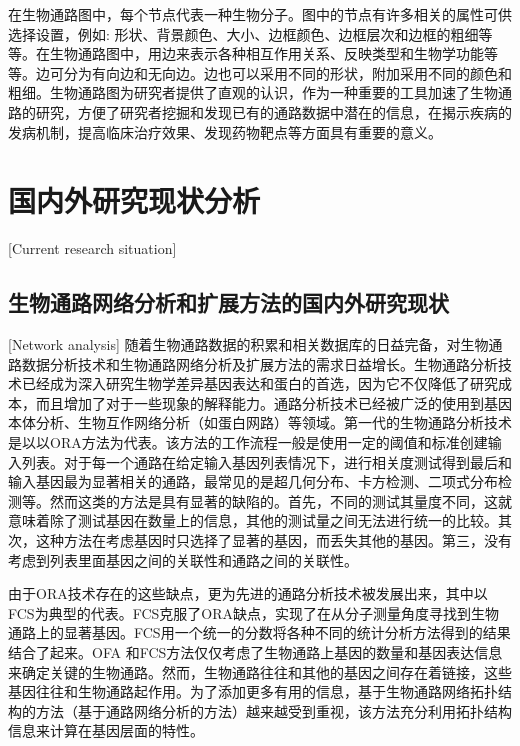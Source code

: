 在生物通路图中，每个节点代表一种生物分子。图中的节点有许多相关的属性可供选择设置，例如: 形状、背景颜色、大小、边框颜色、边框层次和边框的粗细等等。在生物通路图中，用边来表示各种相互作用关系、反映类型和生物学功能等等。边可分为有向边和无向边。边也可以采用不同的形状，附加采用不同的颜色和粗细。生物通路图为研究者提供了直观的认识，作为一种重要的工具加速了生物通路的研究，方便了研究者挖掘和发现已有的通路数据中潜在的信息，在揭示疾病的发病机制，提高临床治疗效果、发现药物靶点等方面具有重要的意义。

\section{国内外研究现状分析}[Current research situation]
\subsection{生物通路网络分析和扩展方法的国内外研究现状}[Network analysis]
 随着生物通路数据的积累和相关数据库的日益完备，对生物通路数据分析技术和生物通路网络分析及扩展方法的需求日益增长。生物通路分析技术已经成为深入研究生物学差异基因表达和蛋白的首选，因为它不仅降低了研究成本，而且增加了对于一些现象的解释能力。通路分析技术已经被广泛的使用到基因本体分析、生物互作网络分析（如蛋白网路）等领域。第一代的生物通路分析技术是以以ORA\cite{goeman2007analyzing}方法为代表。该方法的工作流程一般是使用一定的阈值和标准创建输入列表。对于每一个通路在给定输入基因列表情况下，进行相关度测试得到最后和输入基因最为显著相关的通路，最常见的是超几何分布、卡方检测、二项式分布检测等。然而这类的方法是具有显著的缺陷的。首先，不同的测试其量度不同，这就意味着除了测试基因在数量上的信息，其他的测试量之间无法进行统一的比较。其次，这种方法在考虑基因时只选择了显著的基因，而丢失其他的基因。第三，没有考虑到列表里面基因之间的关联性和通路之间的关联性。

 由于ORA技术存在的这些缺点，更为先进的通路分析技术被发展出来，其中以FCS\cite{lee2011prioritizing}为典型的代表。FCS克服了ORA缺点，实现了在从分子测量角度寻找到生物通路上的显著基因。FCS用一个统一的分数将各种不同的统计分析方法得到的结果结合了起来。OFA 和FCS方法仅仅考虑了生物通路上基因的数量和基因表达信息来确定关键的生物通路。然而，生物通路往往和其他的基因之间存在着链接，这些基因往往和生物通路起作用。为了添加更多有用的信息，基于生物通路网络拓扑结构的方法（基于通路网络分析的方法）越来越受到重视，该方法充分利用拓扑结构信息来计算在基因层面的特性。

